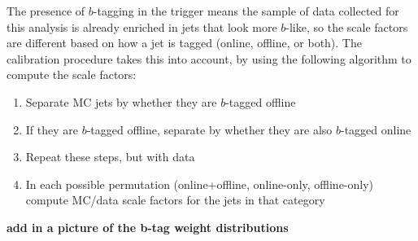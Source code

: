 The presence of $b$-tagging in the trigger means the sample of data collected for this 
analysis is already enriched in jets that look more $b$-like, so the scale factors
are different based on how a jet is tagged (online, offline, or both). 
The calibration procedure takes this into account, by using the following algorithm
to compute the scale factors:
\begin{enumerate}
    \item Separate MC jets by whether they are $b$-tagged offline
    \item If they are $b$-tagged offline, separate by whether they are 
        also $b$-tagged online
    \item Repeat these steps, but with data
    \item In each possible permutation (online+offline, online-only, offline-only)
        compute MC/data scale factors for the jets in that category 
\end{enumerate}


\textbf{add in a picture of the b-tag weight distributions}













